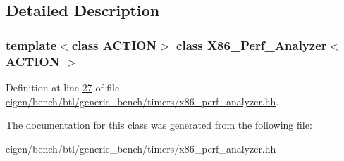 \subsection{Detailed Description}
\subsubsection*{template$<$class A\+C\+T\+I\+ON$>$\newline
class X86\+\_\+\+Perf\+\_\+\+Analyzer$<$ A\+C\+T\+I\+O\+N $>$}



Definition at line \hyperlink{eigen_2bench_2btl_2generic__bench_2timers_2x86__perf__analyzer_8hh_source_l00027}{27} of file \hyperlink{eigen_2bench_2btl_2generic__bench_2timers_2x86__perf__analyzer_8hh_source}{eigen/bench/btl/generic\+\_\+bench/timers/x86\+\_\+perf\+\_\+analyzer.\+hh}.



The documentation for this class was generated from the following file\+:\begin{DoxyCompactItemize}
\item 
eigen/bench/btl/generic\+\_\+bench/timers/x86\+\_\+perf\+\_\+analyzer.\+hh\end{DoxyCompactItemize}
